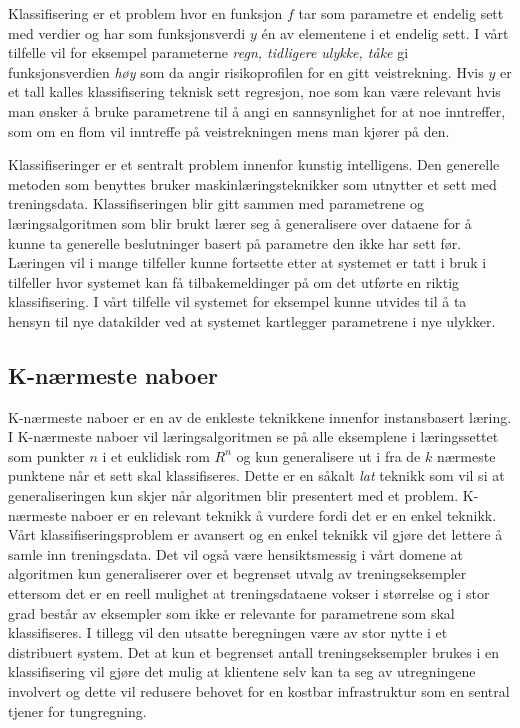 \documentclass[a4paper,norsk,oneside]{book}
\begin{document}
Klassifisering er et problem hvor en funksjon $f$ tar som parametre et endelig sett med verdier og har som funksjonsverdi $y$ én av elementene i et endelig sett.\cite{norvig} I vårt tilfelle vil for eksempel parameterne \textit{regn, tidligere ulykke, tåke} gi funksjonsverdien \textit{høy} som da angir risikoprofilen for en gitt veistrekning. Hvis $y$ er et tall kalles klassifisering teknisk sett regresjon, noe som kan være relevant hvis man ønsker å bruke parametrene til å angi en sannsynlighet for at noe inntreffer, som om en flom vil inntreffe på veistrekningen mens man kjører på den.

Klassifiseringer er et sentralt problem innenfor kunstig intelligens. Den generelle metoden som benyttes bruker maskinlæringsteknikker som utnytter et sett med treningsdata. Klassifiseringen blir gitt sammen med parametrene og læringsalgoritmen som blir brukt lærer seg å generalisere over dataene for å kunne ta generelle beslutninger basert på parametre den ikke har sett før. Læringen vil i mange tilfeller kunne fortsette etter at systemet er tatt i bruk i tilfeller hvor systemet kan få tilbakemeldinger på om det utførte en riktig klassifisering. I vårt tilfelle vil systemet for eksempel kunne utvides til å ta hensyn til nye datakilder ved at systemet kartlegger parametrene i nye ulykker.	

\subsection{K-nærmeste naboer}
K-nærmeste naboer er en av de enkleste teknikkene innenfor instansbasert læring. I K-nærmeste naboer vil læringsalgoritmen se på alle eksemplene i læringssettet som punkter $n$ i et euklidisk rom $R^n$ og kun generalisere ut i fra de $k$ nærmeste punktene når et sett skal klassifiseres.\cite{mitchell} Dette er en såkalt \textit{lat} teknikk som vil si at generaliseringen kun skjer når algoritmen blir presentert med et problem. K-nærmeste naboer er en relevant teknikk å vurdere fordi det er en enkel teknikk. Vårt klassifiseringsproblem er avansert og en enkel teknikk vil gjøre det lettere å samle inn treningsdata. Det vil også være hensiktsmessig i vårt domene at algoritmen kun generaliserer over et begrenset utvalg av treningseksempler ettersom det er en reell mulighet at treningsdataene vokser i størrelse og i stor grad består av eksempler som ikke er relevante for parametrene som skal klassifiseres. I tillegg vil den utsatte beregningen være av stor nytte i et distribuert system. Det at kun et begrenset antall treningseksempler brukes i en klassifisering vil gjøre det mulig at klientene selv kan ta seg av utregningene involvert og dette vil redusere behovet for en kostbar infrastruktur som en sentral tjener for tungregning.
\end{document}
